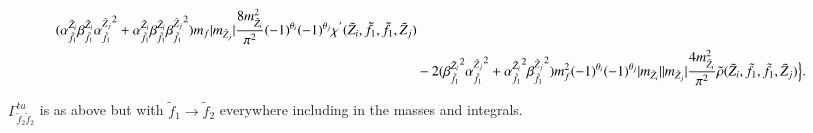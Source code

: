 \documentclass[final,3p,times]{elsarticle}
\begin{document}
\begin{equation}
\begin{aligned}
({\alpha_{\tilde{f}_1}^{\tilde{Z}_i}}{\beta_{\tilde{f}_1}^{\tilde{Z}_i}}{\alpha_{\tilde{f}_1}^{\tilde{Z}_j}}^2 + {\alpha_{\tilde{f}_1}^{\tilde{Z}_i}}{\beta_{\tilde{f}_1}^{\tilde{Z}_i}} {\beta_{\tilde{f}_1}^{\tilde{Z}_j}}^2)m_{f}|m_{\tilde{Z}_j}|{8m_{\tilde{Z}_i}^2 \over \pi^2}(-1)^{\theta_i}(-1)^{\theta_j}\chi^{'}(\tilde{Z}_i,\tilde{f}_1,\tilde{f}_1,\tilde{Z}_j) \\ & -2({\beta_{\tilde{f}_1}^{\tilde{Z}_i}}^2{\alpha_{\tilde{f}_1}^{\tilde{Z}_j}}^2   + {\alpha_{\tilde{f}_1}^{\tilde{Z}_i}}^2 {\beta_{\tilde{f}_1}^{\tilde{Z}_j}}^2)m_{f}^2 (-1)^{\theta_i}(-1)^{\theta_j}|m_{\tilde{Z}_i}||m_{\tilde{Z}_j}|{4 m_{\tilde{Z}_i}^2 \over \pi^2}\tilde{\rho}(\tilde{Z}_i,\tilde{f}_1,\tilde{f}_1,\tilde{Z}_j)\Big\}.
\end{aligned}
\end{equation}

$\Gamma_{\tilde{f}_2 \tilde{f}_2}^{tu}$ is as above but with $\tilde{f}_1 \rightarrow \tilde{f}_2$ everywhere including in the masses and integrals.
\end{document}
